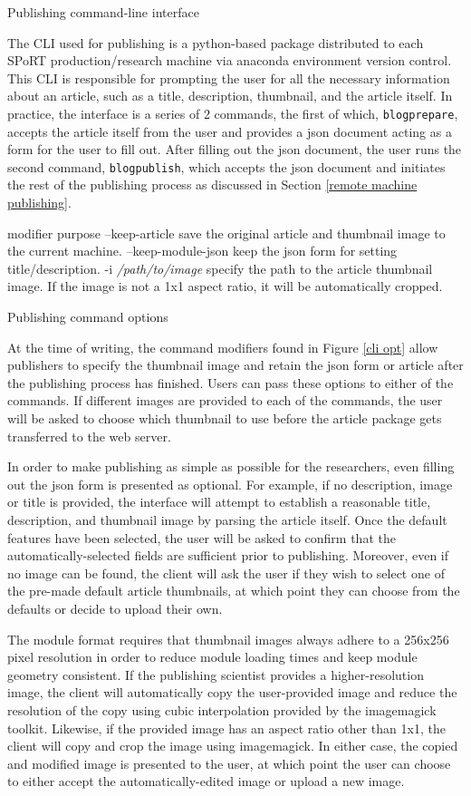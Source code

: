 Publishing command-line interface

The CLI used for publishing is a python-based package distributed to each SPoRT production/research machine via anaconda environment version control. This CLI is responsible for prompting the user for all the necessary information about an article, such as a title, description, thumbnail, and the article itself. In practice, the interface is a series of 2 commands, the first of which, \texttt{blogprepare}, accepts the article itself from the user and provides a json document acting as a form for the user to fill out. After filling out the json document, the user runs the second command, \texttt{blogpublish}, which accepts the json document and initiates the rest of the publishing process as discussed in Section \ref{remote machine publishing}.

modifier purpose
--keep-article save the original article and thumbnail image to the current machine.
--keep-module-json keep the json form for setting title/description.
-i \textit{/path/to/image} specify the path to the article thumbnail image. If the image is not a 1x1 aspect ratio, it will be automatically cropped.

Publishing command options

At the time of writing, the command modifiers found in Figure \ref{cli opt} allow publishers to specify the thumbnail image and retain the json form or article after the publishing process has finished. Users can pass these options to either of the commands. If different images are provided to each of the commands, the user will be asked to choose which thumbnail to use before the article package gets transferred to the web server.

In order to make publishing as simple as possible for the researchers, even filling out the json form is presented as optional. For example, if no description, image or title is provided, the interface will attempt to establish a reasonable title, description, and thumbnail image by parsing the article itself. Once the default features have been selected, the user will be asked to confirm that the automatically-selected fields are sufficient prior to publishing. Moreover, even if no image can be found, the client will ask the user if they wish to select one of the pre-made default article thumbnails, at which point they can choose from the defaults or decide to upload their own.

The module format requires that thumbnail images always adhere to a 256x256 pixel resolution in order to reduce module loading times and keep module geometry consistent. If the publishing scientist provides a higher-resolution image, the client will automatically copy the user-provided image and reduce the resolution of the copy using cubic interpolation provided by the imagemagick toolkit. Likewise, if the provided image has an aspect ratio other than 1x1, the client will copy and crop the image using imagemagick. In either case, the copied and modified image is presented to the user, at which point the user can choose to either accept the automatically-edited image or upload a new image.

